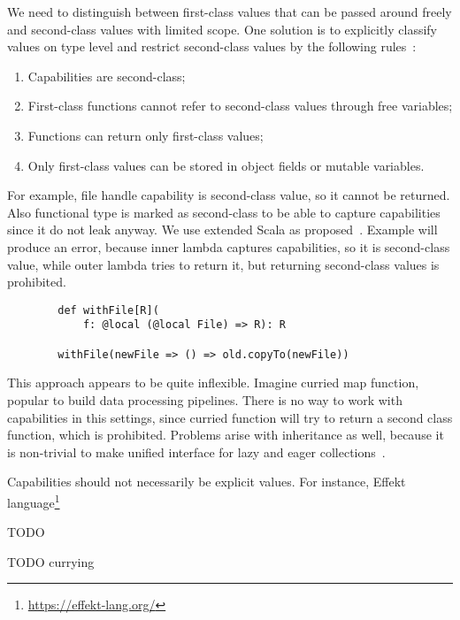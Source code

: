 \documentclass[conference]{IEEEtran}
\begin{document}
    We need to distinguish between first-class values that can be passed around freely and second-class values with limited scope.
    One solution is to explicitly classify values on type level and restrict second-class values by the following rules~\cite{osvald2016gentrification}:
    \begin{enumerate}
        \item Capabilities are second-class;
        \item First-class functions cannot refer to second-class values through free variables;
        \item Functions can return only first-class values;
        \item Only first-class values can be stored in object fields or mutable variables.
    \end{enumerate}

    For example, file handle capability is second-class value, so it cannot be returned.
    Also functional type is marked as second-class to be able to capture capabilities since it do not leak anyway.
    We use extended Scala as proposed~\cite{osvald2016gentrification}.
    Example will produce an error, because inner lambda captures capabilities, so it is second-class value, while outer lambda tries to return it, but returning second-class values is prohibited.
    \begin{verbatim}
        def withFile[R](
            f: @local (@local File) => R): R

        withFile(newFile => () => old.copyTo(newFile))
    \end{verbatim}

    This approach appears to be quite inflexible.
    Imagine curried map function, popular to build data processing pipelines.
    There is no way to work with capabilities in this settings, since curried function will try to return a second class function, which is prohibited.
    Problems arise with inheritance as well, because it is non-trivial to make unified interface for lazy and eager collections~\cite{osvald2016gentrification}.

    Capabilities should not necessarily be explicit values.
    For instance, Effekt language\footnote{\url{https://effekt-lang.org/}}

    TODO \cite{brachthauser2020effects}\cite{brachthauser2022effects}


    TODO currying %

\end{document}
